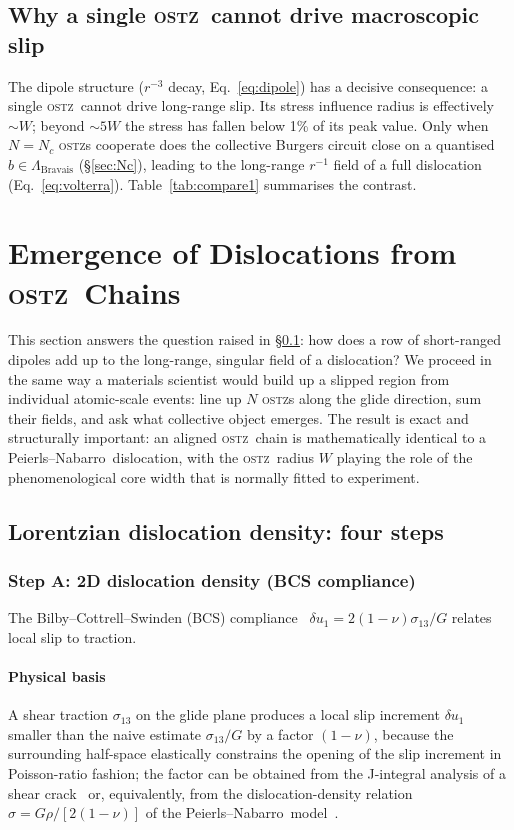 \documentclass[3p]{elsarticle}
\newcommand{\OSTZ}{\textsc{ostz}}
\newcommand{\PN}{Peierls--Nabarro}
\begin{document}
\subsection{Why a single \OSTZ\ cannot drive macroscopic slip}
\label{sec:nomacroslip}

The dipole structure ($r^{-3}$ decay, Eq.~\eqref{eq:dipole}) has a
decisive consequence: a single \OSTZ\ cannot drive long-range slip.
Its stress influence radius is effectively $\sim W$; beyond $\sim5W$
the stress has fallen below 1\% of its peak value. Only when
$N=N_c$ \OSTZ s cooperate does the collective Burgers circuit close
on a quantised $b\in\Lambda_\mathrm{Bravais}$
(\S\ref{sec:Nc}), leading to the long-range $r^{-1}$ field of a full
dislocation (Eq.~\eqref{eq:volterra}). Table~\ref{tab:compare1}
summarises the contrast.

\section{Emergence of Dislocations from \OSTZ\ Chains}
\label{sec:emergence}

This section answers the question raised in
\S\ref{sec:nomacroslip}: how does a row of short-ranged dipoles add
up to the long-range, singular field of a dislocation? We
proceed in the same way a materials scientist would build up a
slipped region from individual atomic-scale events: line up $N$
\OSTZ s along the glide direction, sum their fields, and ask what
collective object emerges. The result is exact and structurally
important: an aligned \OSTZ\ chain is mathematically identical to a
\PN\ dislocation, with the \OSTZ\ radius $W$ playing the role of the
phenomenological core width that is normally fitted to experiment.

\subsection{Lorentzian dislocation density: four steps}
\label{sec:lorentzian}

\subsubsection{Step A: 2D dislocation density (BCS compliance)}
\label{sec:stepA-BCS}

The Bilby--Cottrell--Swinden (BCS) compliance~\citep{bilby1963}
$\delta u_1=2(1-\nu)\sigma_{13}/G$ relates local slip to traction.
\paragraph{Physical basis} A shear traction $\sigma_{13}$ on the
glide plane produces a local slip increment $\delta u_1$ smaller
than the naive estimate $\sigma_{13}/G$ by a factor $(1-\nu)$,
because the surrounding half-space elastically constrains the
opening of the slip increment in Poisson-ratio fashion; the factor
can be obtained from the J-integral analysis of a shear
crack~\citep{rice1968} or, equivalently, from the dislocation-density
relation $\sigma=G\rho/[2(1-\nu)]$ of the \PN\
model~\citep{hirth1982}.
\end{document}
